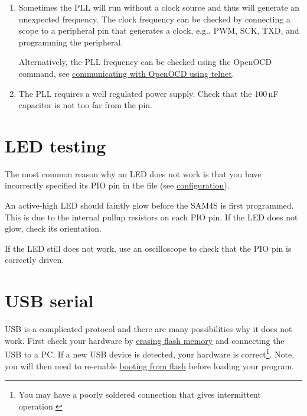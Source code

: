 \begin{enumerate}
\item Sometimes the PLL will run without a clock source and thus will
  generate an unexpected frequency.  The clock frequency can be
  checked by connecting a scope to a peripheral pin that generates a
  clock, e.g., PWM, SCK, TXD, and programming the peripheral.

  Alternatively, the PLL frequency can be checked using the OpenOCD
   command, see
  \hyperref[communicating-with-openocd-using-telnet]{communicating
      with OpenOCD using telnet}.

\item The PLL requires a well regulated power supply.  Check that the
  100\,nF capacitor is not too far from the  pin.
\end{enumerate}


\section{LED testing}
\label{debugging-LED}

The most common reason why an LED does not work is that you have
incorrectly specified its PIO pin in the  file (see
\protect\hyperref[configuration]{configuration}).

An active-high LED should faintly glow before the SAM4S is first
programmed.  This is due to the internal pullup resistors on each PIO
pin.  If the LED does not glow, check its orientation.

If the LED still does not work, use an oscilloscope to check that the
PIO pin is correctly driven.


\section{USB serial}
\label{debugging-usb}

USB is a complicated protocol and there are many possibilities why it
does not work.  First check your hardware by
\hyperref[erasing-flash-memory]{erasing flash memory} and connecting
the USB to a PC.  If a new USB device is detected, your hardware is
correct\footnote{You may have a poorly soldered connection that gives
  intermittent operation.}.  Note, you will then need to re-enable
\hyperref[booting-from-flash-memory]{booting from flash} before
loading your program.

